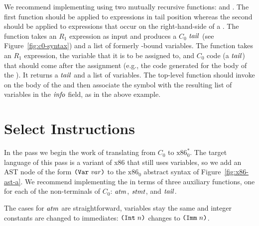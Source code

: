 \documentclass[11pt]{book}
\begin{document}
We recommend implementing  using two mutually
recursive functions:  and
.  The first function should be applied to
expressions in tail position whereas the second should be applied to
expressions that occur on the right-hand-side of a . The
 function takes an $R_1$ expression as input and
produces a $C_0$ $\mathit{tail}$ (see Figure~\ref{fig:c0-syntax}) and a list
of formerly -bound variables. The 
function takes an $R_1$ expression, the variable that it is to be
assigned to, and $C_0$ code (a $\mathit{tail}$) that should come after the
assignment (e.g., the code generated for the body of the ).
It returns a $\mathit{tail}$ and a list of variables. The top-level
 function should invoke 
on the body of the  and then associate the 
symbol with the resulting list of variables in the $\mathit{info}$ field,
as in the above example.

\section{Select Instructions}
\label{sec:select-r1}

In the  pass we begin the work of
translating from $C_0$ to $\text{x86}^{*}_0$. The target language of
this pass is a variant of x86 that still uses variables, so we add an
AST node of the form $\texttt{(Var}\;\mathit{var}\texttt{)}$ to the $\text{x86}_0$ abstract
syntax of Figure~\ref{fig:x86-ast-a}.  We recommend implementing the
 in terms of three auxiliary functions, one
for each of the non-terminals of $C_0$: $\mathit{atm}$, $\mathit{stmt}$, and $\mathit{tail}$.

The cases for $\mathit{atm}$ are straightforward, variables stay
the same and integer constants are changed to immediates:
$\texttt{(Int}\;n\texttt{)}$ changes to $\texttt{(Imm}\;n\texttt{)}$.
\end{document}
